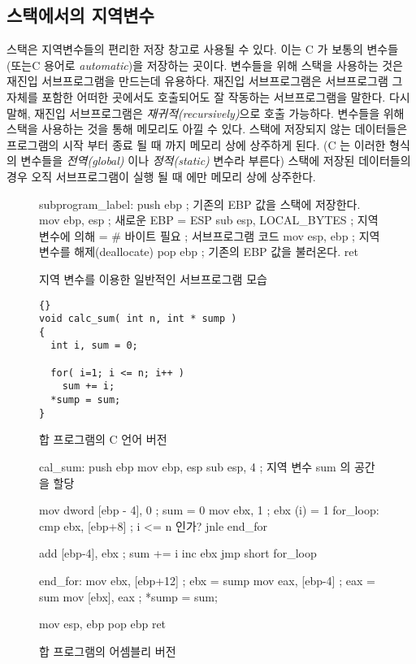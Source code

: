 \subsection{스택에서의 지역변수}

스택은 지역변수들의 편리한 저장 창고로 사용될 수 있다. 이는 C 가 보통의
변수들 (또는C 용어로 \emph{automatic})을 저장하는 곳이다. 변수들을
위해 스택을 사용하는 것은 재진입 서브프로그램을 만드는데 유용하다. 
재진입 서브프로그램은 서브프로그램 그 자체를 포함한 어떠한 곳에서도 호출되어도
잘 작동하는 서브프로그램을 말한다. 다시 말해, 재진입 서브프로그램은 
\emph{재귀적(recursively)}으로 호출 가능하다. 변수들을 위해 스택을 사용하는 것을 통해
메모리도 아낄 수 있다. 스택에 저장되지 않는 데이터들은 프로그램의 
시작 부터 종료 될 때 까지 메모리 상에 상주하게 된다. (C 는 이러한 형식의 변수들을
\emph{전역(global)} 이나 \emph{정적(static)} 변수라 부른다) 스택에 저장된 
데이터들의 경우 오직 서브프로그램이 실행 될 때 에만 메모리 상에 상주한다. 

\begin{figure}[t]
\begin{AsmCodeListing}[frame=single]
subprogram_label:
      push   ebp                ; 기존의 EBP 값을 스택에 저장한다. 
      mov    ebp, esp           ; 새로운 EBP = ESP
      sub    esp, LOCAL_BYTES   ; 지역 변수에 의해 = # 바이트 필요
; 서브프로그램 코드
      mov    esp, ebp           ; 지역 변수를 해제(deallocate)
      pop    ebp                ; 기존의 EBP 값을 불러온다. 
      ret
\end{AsmCodeListing}
\caption{지역 변수를 이용한 일반적인 서브프로그램 모습\label{fig:subskel2}}
\end{figure}

\begin{figure}[t]
\begin{lstlisting}[frame=tlrb]{}
void calc_sum( int n, int * sump )
{
  int i, sum = 0;

  for( i=1; i <= n; i++ )
    sum += i;
  *sump = sum;
}
\end{lstlisting}
\caption{합 프로그램의 C 언어 버전 \label{fig:Csum}}
\end{figure}

\begin{figure}[t]
\begin{AsmCodeListing}[frame=single]
cal_sum:
      push   ebp
      mov    ebp, esp
      sub    esp, 4               ; 지역 변수 sum 의 공간을 할당 

      mov    dword [ebp - 4], 0   ; sum = 0
      mov    ebx, 1               ; ebx (i) = 1
for_loop:
      cmp    ebx, [ebp+8]         ; i <= n 인가?
      jnle   end_for

      add    [ebp-4], ebx         ; sum += i
      inc    ebx
      jmp    short for_loop

end_for:
      mov    ebx, [ebp+12]        ; ebx = sump
      mov    eax, [ebp-4]         ; eax = sum
      mov    [ebx], eax           ; *sump = sum;

      mov    esp, ebp
      pop    ebp
      ret
\end{AsmCodeListing}
\caption{합 프로그램의 어셈블리 버전 \label{fig:Asmsum}}
\end{figure}

